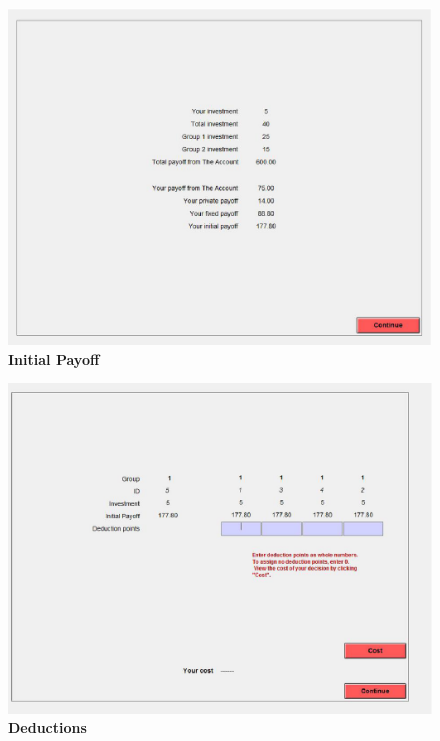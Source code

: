 \documentclass[12pt]{article}
\begin{document}
\centering
\begin{figure}[H]
\includegraphics[width=40pc]{initial_zm}
\caption*{\bf Initial Payoff}
\end{figure}

\newpage

\centering
\begin{figure}[H]
\includegraphics[width=40pc]{deductionsZM}
\caption*{\bf Deductions}
\end{figure}

\newpage
\end{document}
